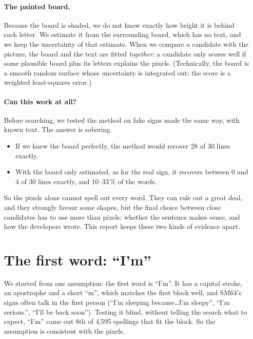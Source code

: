 \documentclass[10pt,a4paper]{article}
\newcommand{\q}[1]{``#1''}
\begin{document}
\paragraph{The painted board.}
Because the board is shaded, we do not know exactly how bright it is behind each letter. We estimate it from the
surrounding board, which has no text, and we keep the uncertainty of that estimate. When we compare a candidate with
the picture, the board and the text are fitted \emph{together}: a candidate only scores well if some plausible board
plus its letters explains the pixels. (Technically, the board is a smooth random surface whose uncertainty is
integrated out; the score is a weighted least-squares error.)

\paragraph{Can this work at all?}
Before searching, we tested the method on fake signs made the same way, with known text. The answer is sobering.
\begin{itemize}
\item If we knew the board perfectly, the method would recover 28 of 30 lines exactly.
\item With the board only estimated, as for the real sign, it recovers between 0 and 4 of 30 lines exactly, and 10--33\,\% of
the words.
\end{itemize}
So the pixels alone cannot spell out every word. They can rule out a great deal, and they strongly favour some
shapes, but the final choice between close candidates has to use more than pixels: whether the sentence makes sense,
and how the developers wrote. This report keeps these two kinds of evidence apart.

\section{The first word: \q{I'm}}
\label{sec:im}
We started from one assumption: the first word is \q{I'm}. It has a capital stroke, an apostrophe and a short
\q{m}, which matches the first block well, and SM64's signs often talk in the first person (\q{I'm sleeping
because\ldots I'm sleepy}, \q{I'm serious.}, \q{I'll be back soon}). Testing it blind, without telling the search what
to expect, \q{I'm} came out 8th of 4{,}595 spellings that fit the block. So the assumption is consistent with the pixels.
\end{document}
